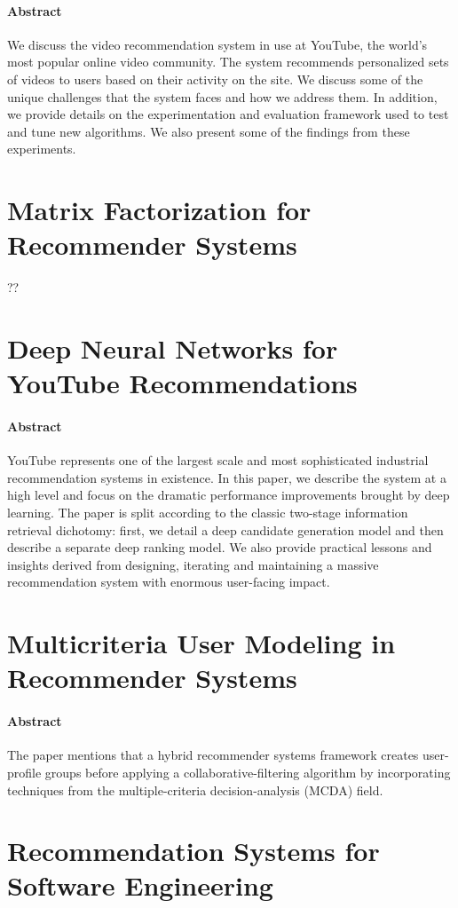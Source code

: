 \documentclass[oneside]{book}
\begin{document}
\paragraph{Abstract}
We discuss the video recommendation system in use at YouTube, the world's most popular online video community. The system recommends personalized sets of videos to users based on their activity on the site. We discuss some of the unique challenges that the system faces and how we address them. In addition, we provide details on the experimentation and evaluation framework used to test and tune new algorithms. We also present some of the findings from these experiments.
\section{Matrix Factorization for Recommender Systems}
??
\section{Deep Neural Networks for YouTube Recommendations}
\paragraph{Abstract}
YouTube represents one of the largest scale and most sophisticated industrial recommendation systems in existence. In this paper, we describe the system at a high level and focus on the dramatic performance improvements brought by deep learning. The paper is split according to the classic two-stage information retrieval dichotomy: first, we detail a deep candidate generation model and then describe a separate deep ranking model. We also provide practical lessons and insights derived from designing, iterating and maintaining a massive recommendation system with enormous user-facing impact. 
\section{Multicriteria User Modeling in Recommender Systems}
\paragraph{Abstract}
The paper mentions that a hybrid recommender systems framework creates user-profile groups before applying a collaborative-filtering algorithm by incorporating techniques from the multiple-criteria decision-analysis (MCDA) field.
\section{Recommendation Systems for Software Engineering}
\end{document}
